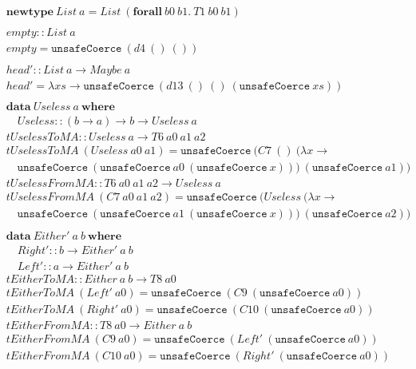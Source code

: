 \begin{align*}
&\mathbf{newtype}\ List\ a = List\ (\mathbf{forall}\ b0\ b1.\ T1\ b0\ b1)\\
\\
&empty :: List\ a\\
&empty = \texttt{unsafeCoerce}\ (d4\ ()\ ())\\
\\
&head' :: List\ a \rightarrow Maybe\ a\\
&head' = \lambda xs \rightarrow \texttt{unsafeCoerce}\ (d13\ ()\ ()\ (
   \texttt{unsafeCoerce}\ xs))\\
\\
&\mathbf{data}\ Useless\ a\ \mathbf{where}\\
&\quad Useless :: (b \rightarrow a) \rightarrow b \rightarrow Useless\ a\\
&tUselessToMA :: Useless\ a \rightarrow T6\ a0\ a1\ a2\\
&tUselessToMA\ (Useless\ a0\ a1) = \texttt{unsafeCoerce}\ (C7\ ()\ (
   \lambda x \rightarrow\\
&\quad\texttt{unsafeCoerce}\ (\texttt{unsafeCoerce}\ a0\ (
   \texttt{unsafeCoerce}\ x)))\ (\texttt{unsafeCoerce}\ a1))\\
&tUselessFromMA :: T6\ a0\ a1\ a2 \rightarrow Useless\ a\\
&tUselessFromMA\ (C7\ a0\ a1\ a2) = \texttt{unsafeCoerce}\ (Useless\ (
   \lambda x \rightarrow\\
&\quad\texttt{unsafeCoerce}\ (\texttt{unsafeCoerce}\ a1\ (
   \texttt{unsafeCoerce}\ x)))\ (\texttt{unsafeCoerce}\ a2))\\
\\
&\mathbf{data}\ Either'\ a\ b\ \mathbf{where}\\
&\quad Right' :: b \rightarrow Either'\ a\ b\\
&\quad Left' :: a \rightarrow Either'\ a\ b\\
&tEitherToMA :: Either\ a\ b \rightarrow T8\ a0\\
&tEitherToMA\ (Left'\ a0) = \texttt{unsafeCoerce}\ (C9\ (\texttt{unsafeCoerce}\ a0))\\
&tEitherToMA\ (Right'\ a0) = \texttt{unsafeCoerce}\ (C10\ (\texttt{unsafeCoerce}\ a0))\\
&tEitherFromMA :: T8\ a0 \rightarrow Either\ a\ b\\
&tEitherFromMA\ (C9\ a0) = \texttt{unsafeCoerce}\ (Left'\ (\texttt{unsafeCoerce}\ a0))\\
&tEitherFromMA\ (C10\ a0) = \texttt{unsafeCoerce}\ (Right'\ (\texttt{unsafeCoerce}\ a0))\\

\end{align*}
